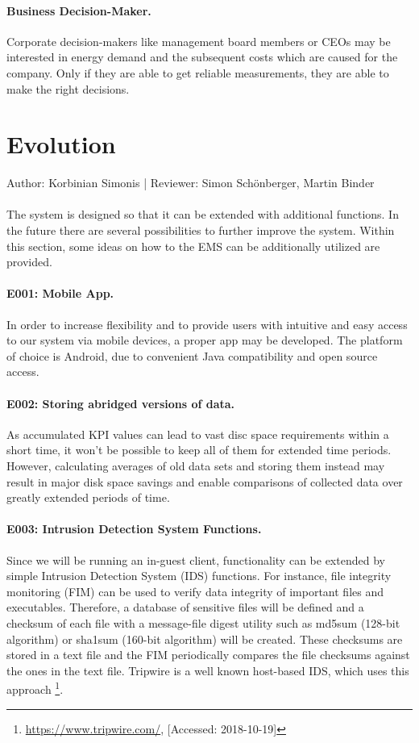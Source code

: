 \documentclass{scrreprt}
\begin{document}
\paragraph{Business Decision-Maker.} Corporate decision-makers like management board members
or CEOs may be interested in energy demand and the subsequent costs which are caused for
the company. Only if they are able to get reliable measurements, they are able to make
the right decisions.

\section{Evolution}
Author: Korbinian Simonis |
Reviewer: Simon Sch\"onberger, Martin Binder \\ \\
The system is designed so that it can be extended with additional functions. In the future there are several possibilities to further improve the system. Within this section, some ideas on how to the EMS can be additionally utilized are provided.

\paragraph{E001: Mobile App.} 
In order to increase flexibility and to provide users with intuitive and easy access to our system via mobile devices, a proper app may be developed. 
The platform of choice is Android, due to convenient Java compatibility and open source access.

\paragraph{E002: Storing abridged versions of data.}
As accumulated KPI values can lead to vast disc space requirements within a short time, it won't be possible to keep all of them for extended time periods. However, calculating averages of old data sets and storing them instead may result in major disk space savings and enable comparisons of collected data over greatly extended periods of time.

\paragraph{E003: Intrusion Detection System Functions.}
Since we will be running an in-guest client, functionality can be extended by simple Intrusion Detection System (IDS) functions.
For instance, file integrity monitoring (FIM) can be used to verify data integrity of important files and executables. Therefore, a database of sensitive files will be defined and a checksum of each file with a message-file digest utility such as md5sum (128-bit algorithm) or sha1sum (160-bit algorithm) will be created.
These checksums are stored in a text file and the FIM periodically compares the file checksums against the ones in the text file. Tripwire is a well known host-based IDS, which uses this approach \footnote{\url{https://www.tripwire.com/}, [Accessed: 2018-10-19]}.
\end{document}
